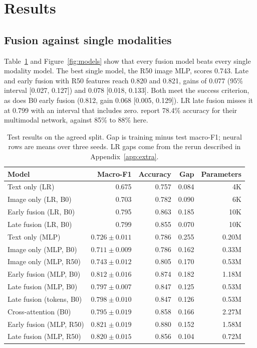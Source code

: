 \documentclass[11pt,a4paper]{article}
\begin{document}
\section{Results}
\label{sec:results}
\subsection{Fusion against single modalities}
Table~\ref{tab:main} and Figure~\ref{fig:models} show that every fusion
model beats every single modality model. The best single model, the R50 image MLP, scores 0.743. Late and early fusion with R50 features reach 0.820 and 0.821, gains of 0.077 (95\% interval [0.027, 0.127]) and 0.078
[0.018, 0.133]. Both meet the success criterion, as does B0 early fusion
(0.812, gain 0.068 [0.005, 0.129]). LR late fusion misses it at 0.799
with an interval that includes zero. \citet{Ofli2020} report 78.4\% accuracy for their multimodal network, against 85\% to 88\% here.

\begin{table}[H]
  \centering
  \small
  \caption{Test results on the agreed split. Gap is training minus test
  macro-F1; neural rows are means over three seeds. LR gaps come from
  the rerun described in Appendix~\ref{app:extra}.}
  \label{tab:main}
  \begin{tabular}{lrrrr}
    \toprule
    Model & Macro-F1 & Accuracy & Gap & Parameters \\
    \midrule
    Text only (LR) & 0.675 & 0.757 & 0.084 & 4K \\
    Image only (LR, B0) & 0.703 & 0.782 & 0.090 & 6K \\
    Early fusion (LR, B0) & 0.795 & 0.863 & 0.185 & 10K \\
    Late fusion (LR, B0) & 0.799 & 0.855 & 0.070 & 10K \\
    \midrule
    Text only (MLP) & $0.726 \pm 0.011$ & 0.786 & 0.255 & 0.20M \\
    Image only (MLP, B0) & $0.711 \pm 0.009$ & 0.786 & 0.162 & 0.33M \\
    Image only (MLP, R50) & $0.743 \pm 0.012$ & 0.805 & 0.170 & 0.53M \\
    \midrule
    Early fusion (MLP, B0) & $0.812 \pm 0.016$ & 0.874 & 0.182 & 1.18M \\
    Late fusion (MLP, B0) & $0.797 \pm 0.007$ & 0.847 & 0.125 & 0.53M \\
    Late fusion (tokens, B0) & $0.798 \pm 0.010$ & 0.847 & 0.126 & 0.53M \\
    Cross-attention (B0) & $0.795 \pm 0.019$ & 0.858 & 0.166 & 2.27M \\
    Early fusion (MLP, R50) & $0.821 \pm 0.019$ & 0.880 & 0.152 & 1.58M \\
    Late fusion (MLP, R50) & $0.820 \pm 0.015$ & 0.856 & 0.104 & 0.72M \\
    \bottomrule
  \end{tabular}
\end{table}
\end{document}
